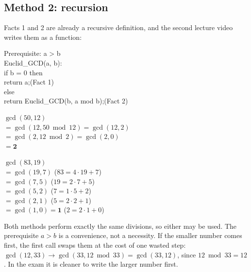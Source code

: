 \subsection{Method 2: recursion}
Facts 1 and 2 are already a recursive definition, and the second lecture video writes them as a function:
\begin{center}
\begin{minipage}{0.45\textwidth}
\small\ttfamily
Prerequisite: a > b\\
Euclid\_GCD(a, b):\\
\hspace*{1.5em}if b = 0 then\\
\hspace*{3em}return a;\hfill\textrm{(Fact 1)}\\
\hspace*{1.5em}else\\
\hspace*{3em}return Euclid\_GCD(b, a mod b);\hfill\textrm{(Fact 2)}
\end{minipage}
\end{center}
\begin{minipage}[t]{0.42\textwidth}
\small
\textbf{$\gcd(50, 12)$}\\
$= \gcd(12, 50 \bmod 12) = \gcd(12, 2)$\\
$= \gcd(2, 12 \bmod 2) = \gcd(2, 0)$\\
$= \mathbf{2}$
\end{minipage}\hfill
\begin{minipage}[t]{0.55\textwidth}
\small
\textbf{$\gcd(83, 19)$}\\
$= \gcd(19, 7)$ \quad ($83 = 4\cdot19 + 7$)\\
$= \gcd(7, 5)$ \quad ($19 = 2\cdot7 + 5$)\\
$= \gcd(5, 2)$ \quad ($7 = 1\cdot5 + 2$)\\
$= \gcd(2, 1)$ \quad ($5 = 2\cdot2 + 1$)\\
$= \gcd(1, 0) = \mathbf{1}$ \quad ($2 = 2\cdot1 + 0$)
\end{minipage}

\medskip
Both methods perform exactly the same divisions, so either may be used. The prerequisite $a > b$ is a convenience, not a necessity. If the smaller number comes first, the first call swaps them at the cost of one wasted step: $\gcd(12, 33) \to \gcd(33, 12 \bmod 33) = \gcd(33, 12)$, since $12 \bmod 33 = 12$. In the exam it is cleaner to write the larger number first.

